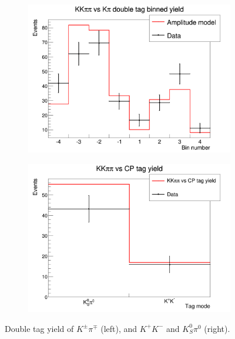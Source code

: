 \documentclass[12pt, a4paper, notitlepage, onecolumn]{article}
\begin{document}
\begin{figure}[H] 
  \centering
  \begin{subfigure}{0.5\textwidth}
    \centering
    \includegraphics[width=1\textwidth]{Plots/DoubleTagYieldFlavour.png}
    \caption{}
    \label{fig_flavour_yield}
  \end{subfigure}%
  \begin{subfigure}{0.5\textwidth}
    \centering
    \includegraphics[width=1\textwidth]{Plots/DoubleTagYieldInclusiveCP.png}
    \caption{}
    \label{fig_cp_yield}
  \end{subfigure}
  \caption{Double tag yield of $K^\pm\pi^\mp$ (left), and $K^+K^-$ and $K_S^0\pi^0$ (right).}
\end{figure}
\end{document}
